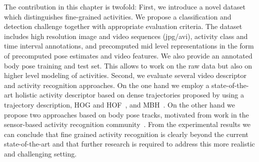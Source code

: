 
%
%

The contribution in this chapter is twofold: First, we introduce a novel dataset which distinguishes \DBnActivities fine-grained activities. We propose a classification and detection challenge together with appropriate evaluation criteria. The dataset includes high resolution image and video sequences (jpg/avi), activity class and time interval annotations, and precomputed mid level representations in the form of precomputed pose estimates and video features. We also provide an annotated body pose training and test set. This allows to work on the raw data but also on higher level modeling of activities. Second, we evaluate several video descriptor and activity recognition approaches. On the one hand we employ a state-of-the-art holistic activity descriptor based on dense trajectories proposed by \citet{wang11cvpr,wang13ijcv} using a trajectory description, HOG and HOF~\citep{laptev08cvpr}, and MBH~\citep{dalal06eccv}. On the other hand we propose two approaches based on body pose tracks, motivated from work in the sensor-based activity recognition community~\citep{zinnen09iswc}.
From the experimental results we can conclude that fine grained activity recognition is clearly beyond the current state-of-the-art and that further research is required to 
address this more realistic and challenging setting. 


